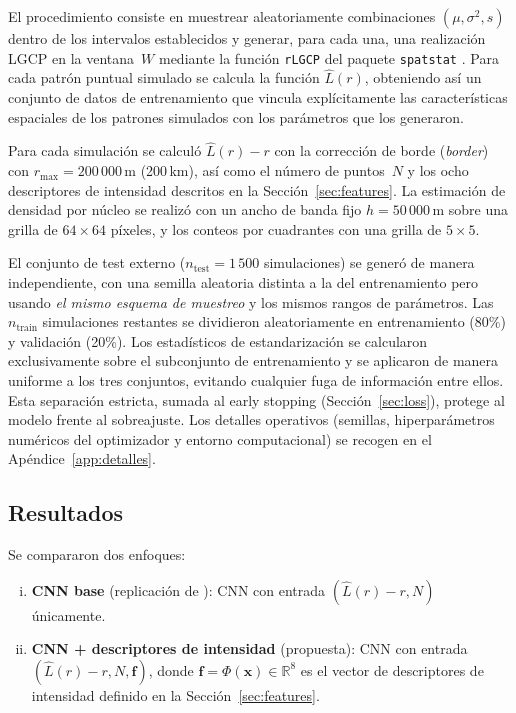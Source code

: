 \documentclass[a4paper,fleqn]{cas-sc}
\numberwithin{equation}{section}
\begin{document}
El procedimiento consiste en muestrear aleatoriamente combinaciones
$(\mu, \sigma^2, s)$ dentro de los intervalos establecidos y generar, para
cada una, una realizaci\'on LGCP en la ventana~$W$ mediante la funci\'on
\texttt{rLGCP} del paquete \texttt{spatstat} \citep{spatstat}. Para cada
patr\'on puntual simulado se calcula la funci\'on $\hat{L}(r)$, obteniendo
as\'i un conjunto de datos de entrenamiento que vincula expl\'icitamente las
caracter\'isticas espaciales de los patrones simulados con los par\'ametros
que los generaron.

Para cada simulaci\'on se calcul\'o $\hat{L}(r)-r$ con la correcci\'on de borde
(\textit{border}) con
$r_{\max}=200\,000$\,m (200\,km), as\'i como el n\'umero de puntos~$N$ y los
ocho descriptores de intensidad descritos en la Secci\'on~\ref{sec:features}.
La estimaci\'on de densidad por n\'ucleo se realiz\'o con un ancho de banda
fijo $h=50\,000$\,m sobre una grilla de $64\times 64$ p\'ixeles, y los
conteos por cuadrantes con una grilla de $5\times 5$.

El conjunto de test externo ($n_{\mathrm{test}}=1\,500$ simulaciones) se generó de manera independiente, con una semilla aleatoria distinta a la del entrenamiento pero usando \emph{el mismo esquema de muestreo} y los mismos rangos de parámetros. Las $n_{\mathrm{train}}$ simulaciones restantes se dividieron aleatoriamente en entrenamiento (80\%) y validación (20\%). Los estadísticos de estandarización se calcularon exclusivamente sobre el subconjunto de entrenamiento y se aplicaron de manera uniforme a los tres conjuntos, evitando cualquier fuga de información entre ellos. Esta separación estricta, sumada al early stopping (Sección~\ref{sec:loss}), protege al modelo frente al sobreajuste. Los detalles operativos (semillas, hiperpar\'ametros num\'ericos del optimizador y entorno computacional) se recogen en el Ap\'endice~\ref{app:detalles}.

\subsection{Resultados}
\label{sec:sim_results}

Se compararon dos enfoques:
\begin{enumerate}[(i)]
    \item \textbf{CNN base} (replicaci\'on de \citealt{VIHRS2022}): CNN con
    entrada $(\hat{L}(r)-r, N)$ \'unicamente.

    \item \textbf{CNN + descriptores de intensidad} (propuesta): CNN con entrada
    $(\hat{L}(r)-r, N, \mathbf{f})$, donde
    $\mathbf{f}=\Phi(\mathbf{x})\in\mathbb{R}^{8}$ es el vector de
    descriptores de intensidad definido en la Secci\'on~\ref{sec:features}.
\end{enumerate}
\end{document}
